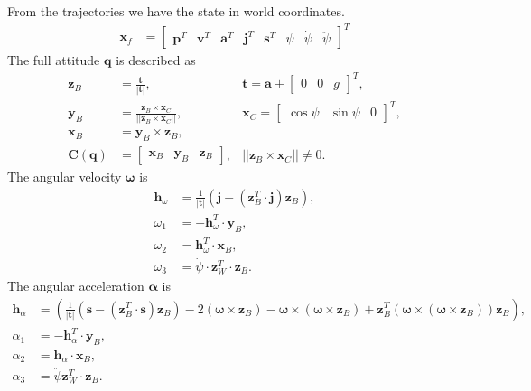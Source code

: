 \documentclass[10pt,a4paper]{article}
\begin{document}
\noindent From the trajectories we have the state in world coordinates.
\begin{align}
\mathbf{x}_f &= \begin{bmatrix}
\mathbf{p}^T & \mathbf{v}^T & \mathbf{a}^T & \mathbf{j}^T & \mathbf{s}^T & \psi & \dot{\psi} & \ddot{\psi}
\end{bmatrix}^T
\end{align}
The full attitude $\mathbf{q}$ is described as
\begin{align}
\mathbf{z}_B &= \frac{\mathbf{t}}{|\mathbf{t}|}, & \mathbf{t} = \mathbf{a} + \begin{bmatrix}
0 & 0 & g
\end{bmatrix}^T, \\
\mathbf{y}_B &= \frac{\mathbf{z}_B \times \mathbf{x}_C}{||\mathbf{z}_B \times \mathbf{x}_C||}, & \mathbf{x}_C = \begin{bmatrix}
\cos \psi & \sin \psi & 0
\end{bmatrix}^T, \\
\mathbf{x}_B &= \mathbf{y}_B \times \mathbf{z}_B, \\
\mathbf{C}(\mathbf{q}) &= \begin{bmatrix}
\mathbf{x}_B & \mathbf{y}_B & \mathbf{z}_B
\end{bmatrix}, & ||\mathbf{z}_B \times \mathbf{x}_C|| \neq 0.
\end{align}
The angular velocity $\boldsymbol{\omega}$ is
\begin{align}
\mathbf{h}_\omega & = \frac{1}{|\mathbf{t}|} \left( \mathbf{j} - \left( \mathbf{z}_B^T \cdot \mathbf{j} \right) \mathbf{z}_B \right), \\
\omega_1 &= - \mathbf{h}_\omega^T \cdot \mathbf{y}_B ,\\
\omega_2 &= \mathbf{h}_\omega^T \cdot \mathbf{x}_B ,\\
\omega_3 &= \dot \psi \cdot \mathbf{z}_W^T \cdot \mathbf{z}_B .
\end{align}
The angular acceleration $\boldsymbol{\alpha}$ is
\begin{align}
\mathbf{h}_\alpha &=  \left( \frac{1}{|\mathbf{t}|} \left( \mathbf{s} - \left( \mathbf{z}_B^T \cdot \mathbf{s} \right) \mathbf{z}_B \right) - 2  \left(\boldsymbol{\omega} \times \mathbf{z}_B \right) - \boldsymbol{\omega} \times \left( \boldsymbol{\omega} \times \mathbf{z}_B \right) + \mathbf{z}_B^T \left( \boldsymbol{\omega} \times \left( \boldsymbol{\omega} \times \mathbf{z}_B \right) \right) \mathbf{z}_B    \right), \\
\alpha_1 &= -\mathbf{h}_\alpha^T \cdot \mathbf{y}_B, \\
\alpha_2 &= \mathbf{h}_\alpha \cdot \mathbf{x}_B, \\
\alpha_3 &= \ddot \psi \mathbf{z}_W^T \cdot \mathbf{z}_B.
\end{align}
\end{document}
